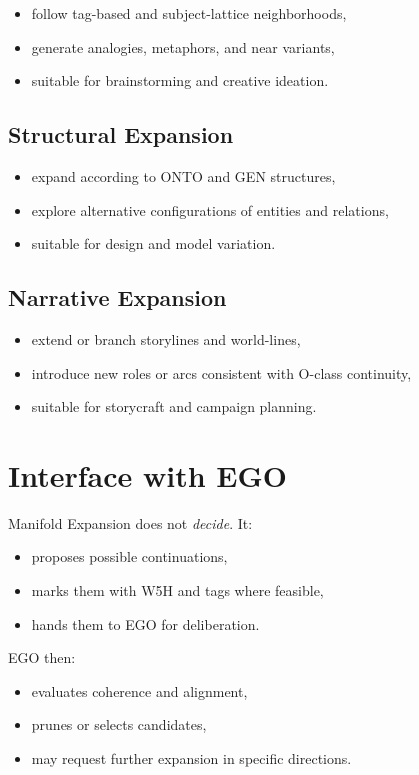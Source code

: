 \begin{itemize}
    \item follow tag-based and subject-lattice neighborhoods,
    \item generate analogies, metaphors, and near variants,
    \item suitable for brainstorming and creative ideation.
\end{itemize}

\subsection{Structural Expansion}

\begin{itemize}
    \item expand according to ONTO and GEN structures,
    \item explore alternative configurations of entities and relations,
    \item suitable for design and model variation.
\end{itemize}

\subsection{Narrative Expansion}

\begin{itemize}
    \item extend or branch storylines and world-lines,
    \item introduce new roles or arcs consistent with O-class continuity,
    \item suitable for storycraft and campaign planning.
\end{itemize}

\section{Interface with EGO}

Manifold Expansion does not \emph{decide}. It:
\begin{itemize}
    \item proposes possible continuations,
    \item marks them with W5H and tags where feasible,
    \item hands them to EGO for deliberation.
\end{itemize}

EGO then:
\begin{itemize}
    \item evaluates coherence and alignment,
    \item prunes or selects candidates,
    \item may request further expansion in specific directions.
\end{itemize}

